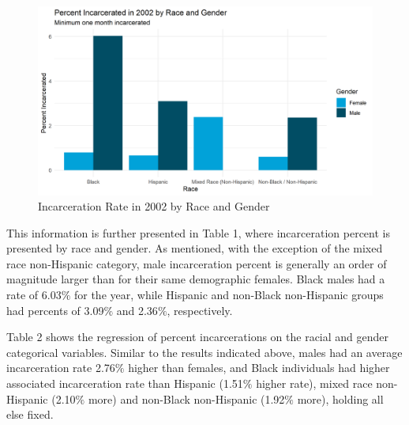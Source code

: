 \documentclass{article}
\begin{document}
\begin{figure}[H]
    \begin{center}
        \includegraphics[width=.85\textwidth]{incarcerationpct_by_racegender}
    \end{center}
    \caption{Incarceration Rate in 2002 by Race and Gender}
    \label{fig:graph}
\end{figure}

This information is further presented in Table 1, where incarceration percent is presented by race and gender. As mentioned, with the exception of the mixed race non-Hispanic category, male incarceration percent is generally an order of magnitude larger than for their same demographic females. Black males had a rate of 6.03$\%$ for the year, while Hispanic and non-Black non-Hispanic groups had percents of 3.09$\%$ and 2.36$\%$, respectively. 



Table 2 shows the regression of percent incarcerations on the racial and gender categorical variables. Similar to the results indicated above, males had an average incarceration rate 2.76$\%$ higher than females, and Black individuals had higher associated incarceration rate than Hispanic (1.51$\%$ higher rate), mixed race non-Hispanic (2.10$\%$ more) and non-Black non-Hispanic (1.92$\%$ more), holding all else fixed. 
 

\end{document}
